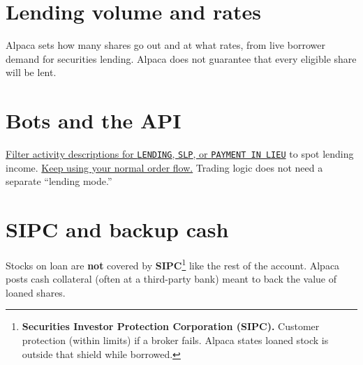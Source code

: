 \documentclass{article}
\begin{document}
\section{Lending volume and rates}
Alpaca sets how many shares go out and at what rates, from live borrower demand for securities lending. Alpaca does not guarantee that every eligible share will be lent.


\section{Bots and the API}
\uline{Filter activity descriptions for \texttt{LENDING}, \texttt{SLP}, or \texttt{PAYMENT IN LIEU}} to spot lending income. \uline{Keep using your normal order flow.} Trading logic does not need a separate ``lending mode.''

\section{SIPC and backup cash}
Stocks on loan are \textbf{not} covered by \textbf{SIPC}\footnote{\textbf{Securities Investor Protection Corporation (SIPC).} Customer protection (within limits) if a broker fails. Alpaca states loaned stock is outside that shield while borrowed.} like the rest of the account. Alpaca posts cash collateral (often at a third-party bank) meant to back the value of loaned shares.
\end{document}
